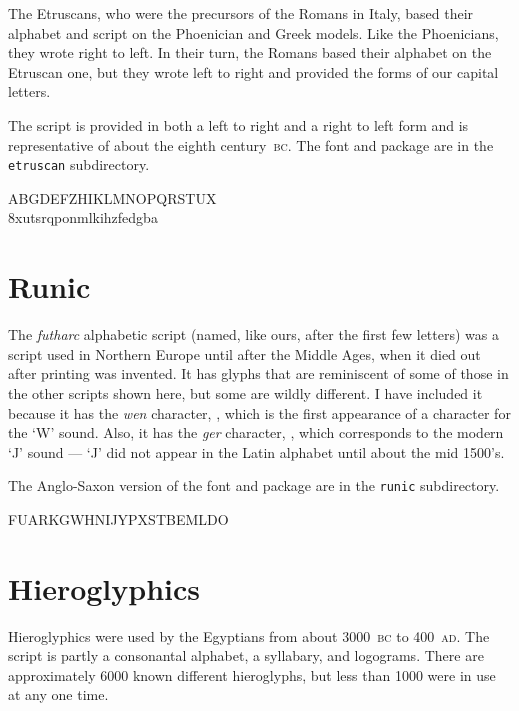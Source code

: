 \documentclass{article}
\newcommand{\BC}{\textsc{bc}}
\newcommand{\AD}{\textsc{ad}}
\begin{document}
    The Etruscans, who were the precursors of the Romans in Italy, based their
alphabet and script on the Phoenician and Greek models. Like the Phoenicians,
they wrote right to left. In their turn, the Romans based their alphabet on
the Etruscan one, but they wrote left to right and provided the forms of
our capital letters.

    The script is provided in both a left to right and a right to left form
and is representative of about the eighth century~\BC.
    The font and package are in the \texttt{etruscan} subdirectory.

\begin{center}
\etrfamily
ABGDEFZH\TTheta IKLMN\TXi OP\Tsade QRSTUX\TPhi{}\\
8\tPsi\tPhi xutsrq\tsade po\tXi nmlki\tTheta hzfedgba
\end{center}
    

\section{Runic}

    The \textit{futharc} alphabetic script 
(named, like ours, after the first few letters)
was a script used in Northern Europe until after the Middle Ages, when it
died out after printing was invented. It has glyphs that are reminiscent of
some of those in the other scripts shown here, but some are wildly different.
I have included it because it has the \textit{wen} character, ,
which is the first appearance of a character for the `W' sound. Also, it
has the \textit{ger} character, , which corresponds to the modern
`J' sound --- `J' did not appear in the Latin alphabet until about the mid
1500's.

    The Anglo-Saxon version of the font and package are in the \texttt{runic} 
subdirectory.

\begin{center}
\futfamily
FU\Fthorn ARKGWHNIJYPXSTBEML\Fng DO
\end{center}

\section{Hieroglyphics}

    Hieroglyphics were used by the Egyptians from about 3000~\BC{} to
400~\AD. The script is partly a consonantal alphabet, a syllabary,
and logograms. There are approximately 6000 known different
hieroglyphs, but less than 1000 were in use at any one time.
\end{document}
